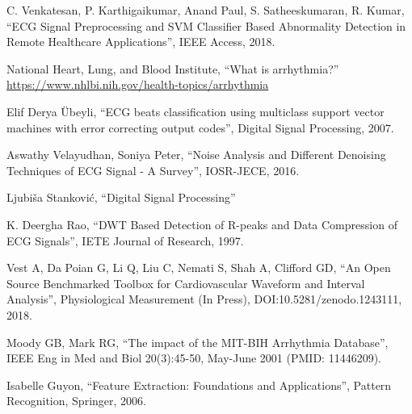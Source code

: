 \documentclass[12pt]{SeminarskiADS}
\begin{document}
\clearpage
\begin{thebibliography}{99}
 C. Venkatesan, P. Karthigaikumar, Anand Paul, S. Satheeskumaran, R. Kumar, ``ECG Signal Preprocessing and SVM Classifier Based Abnormality Detection in Remote Healthcare Applications'', IEEE Access, 2018.

 National Heart, Lung, and Blood Institute, ``What is arrhythmia?''
\url{https://www.nhlbi.nih.gov/health-topics/arrhythmia}

 Elif Derya Übeyli, ``ECG beats classification using multiclass support vector machines with error correcting output codes'', Digital Signal Processing, 2007.

 Aswathy Velayudhan, Soniya Peter, ``Noise Analysis and Different Denoising Techniques of ECG Signal - A Survey'', IOSR-JECE, 2016.

 Ljubiša Stanković, ``Digital Signal Processing''

 K. Deergha Rao, ``DWT Based Detection of R-peaks and Data Compression of ECG Signals'', IETE Journal of Research, 1997.

 Vest A, Da Poian G, Li Q, Liu C, Nemati S, Shah A, Clifford GD, ``An Open Source Benchmarked Toolbox for Cardiovascular Waveform and Interval Analysis'', Physiological Measurement (In Press), DOI:10.5281/zenodo.1243111, 2018.

 Moody GB, Mark RG, ``The impact of the MIT-BIH Arrhythmia Database'', IEEE Eng in Med and Biol 20(3):45-50, May-June 2001 (PMID: 11446209). 

 Isabelle Guyon, ``Feature Extraction: Foundations and Applications'', Pattern Recognition, Springer, 2006.

\end{thebibliography}
\end{document}
